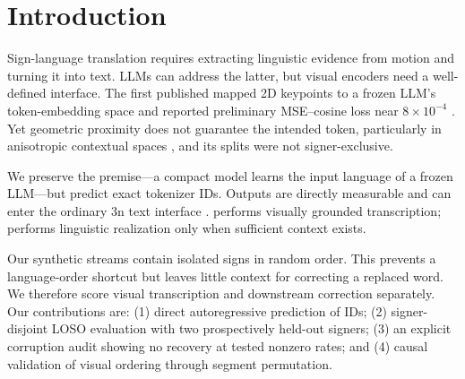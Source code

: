 \section{Introduction}

Sign-language translation requires extracting linguistic evidence from motion and
turning it into text.  LLMs can address the latter, but visual encoders need a
well-defined interface.  The first published \system{} mapped 2D keypoints to a
frozen LLM's token-embedding space and reported preliminary MSE--cosine loss near
$8\times10^{-4}$ \citep{velasquez2026imitator}.  Yet geometric proximity does not
guarantee the intended token, particularly in anisotropic contextual spaces
\citep{ethayarajh2019contextual}, and its splits were not signer-exclusive.

We preserve the premise---a compact model learns the input language of a frozen
LLM---but predict exact \Gemma{} tokenizer IDs.  Outputs are directly measurable
and can enter the ordinary \Gemma{} 3n text interface \citep{gemma3n}.  \system{}
performs visually grounded transcription; \Gemma{} performs linguistic realization
only when sufficient context exists.

Our synthetic streams contain isolated signs in random order.  This prevents a
language-order shortcut but leaves little context for correcting a replaced word.
We therefore score visual transcription and downstream correction separately.
Our contributions are: (1) direct autoregressive prediction of \Gemma{} IDs;
(2) signer-disjoint LOSO evaluation with two prospectively held-out signers;
(3) an explicit corruption audit showing no recovery at tested nonzero rates; and
(4) causal validation of visual ordering through segment permutation.
